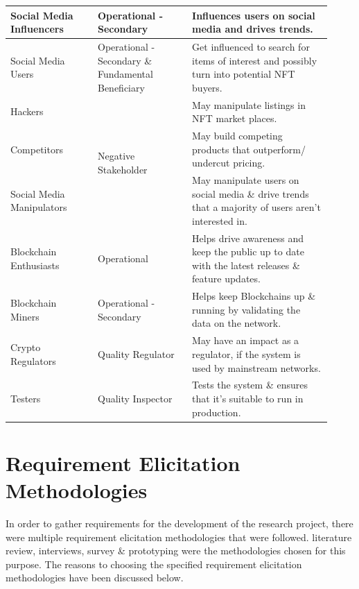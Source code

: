\begin{longtable}{|p{0.25\linewidth}|p{0.27\linewidth}|p{0.4\linewidth}|}
\hline
Social Media Influencers & Operational - Secondary & Influences users on social media and drives trends. \\* 
\hline
Social Media Users & Operational - Secondary \& Fundamental Beneficiary & Get influenced to search for items of interest and possibly turn into potential NFT buyers. \\* 
\hline
Hackers & \multirow{3}{*}{Negative Stakeholder} & May manipulate listings in NFT market places. \\* 
\cline{1-1}\cline{3-3}
Competitors &  & May build competing products that outperform/ undercut pricing. \\* 
\cline{1-1}\cline{3-3}
Social Media Manipulators &  & May manipulate users on social media \& drive trends that a majority of users aren’t interested in. \\ 
\hline
Blockchain Enthusiasts & Operational & Helps drive awareness and keep the public up to date with the latest releases \& feature updates. \\ 
\hline
Blockchain Miners & Operational - Secondary & Helps keep Blockchains up \& running by validating the data on the network. \\ 
\hline
Crypto Regulators & Quality Regulator & May have an impact as a regulator, if the system is used by mainstream networks.\\
\hline
Testers & Quality Inspector & Tests the system \& ensures that it's suitable to run in production.\\
\hline
\end{longtable}


\section{Requirement Elicitation Methodologies}
In order to gather requirements for the development of the research project, there were multiple requirement elicitation methodologies that were followed. literature review, interviews, survey \& prototyping were the methodologies chosen for this purpose.
The reasons to choosing the specified requirement elicitation methodologies have been discussed below.

